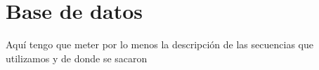 \section{Base de datos} 
\label{section_base_de_datos}
Aquí tengo que meter por lo menos la descripción de las secuencias que utilizamos y de donde se sacaron